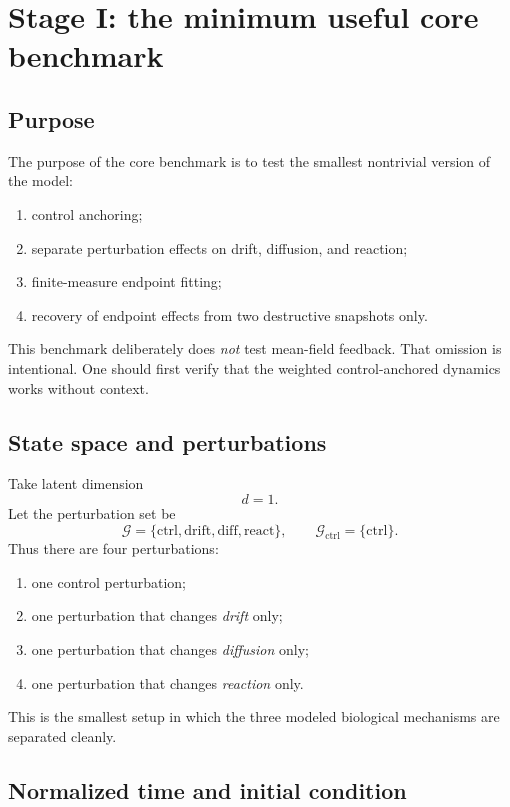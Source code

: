 \documentclass[11pt]{article}
\newcommand{\Gcal}{\mathcal{G}}
\newcommand{\Gctrl}{\mathcal{G}_{\mathrm{ctrl}}}
\begin{document}
\section{Stage I: the minimum useful core benchmark}

\subsection{Purpose}

The purpose of the core benchmark is to test the smallest nontrivial version of the model:
\begin{enumerate}[label=(\roman*),leftmargin=2.2em]
    \item control anchoring;
    \item separate perturbation effects on drift, diffusion, and reaction;
    \item finite-measure endpoint fitting;
    \item recovery of endpoint effects from two destructive snapshots only.
\end{enumerate}

This benchmark deliberately does \emph{not} test mean-field feedback. That omission is intentional. One should first verify that the weighted control-anchored dynamics works without context.

\subsection{State space and perturbations}

Take latent dimension
\[
d=1.
\]
Let the perturbation set be
\[
\Gcal=\{\mathrm{ctrl},\mathrm{drift},\mathrm{diff},\mathrm{react}\},
\qquad
\Gctrl=\{\mathrm{ctrl}\}.
\]
Thus there are four perturbations:
\begin{enumerate}[label=(\arabic*),leftmargin=2.2em]
    \item one control perturbation;
    \item one perturbation that changes \emph{drift} only;
    \item one perturbation that changes \emph{diffusion} only;
    \item one perturbation that changes \emph{reaction} only.
\end{enumerate}

This is the smallest setup in which the three modeled biological mechanisms are separated cleanly.

\subsection{Normalized time and initial condition}
\end{document}
